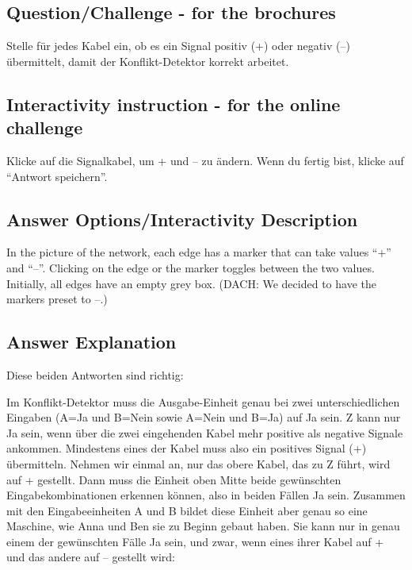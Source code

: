 \documentclass[a4paper,11pt]{report}
\newcommand{\taskGraphicsFolder}{..}
\begin{document}
{\em


\subsection*{Question/Challenge - for the brochures}

Stelle für jedes Kabel ein, ob es ein Signal positiv (+) oder negativ (–) übermittelt, damit der Konflikt-Detektor korrekt arbeitet.

{\centering%
\par}

}


\subsection*{Interactivity instruction - for the online challenge}

Klicke auf die Signalkabel, um + und – zu ändern. Wenn du fertig bist, klicke auf \enquote{Antwort speichern}.

\begingroup
\renewcommand{\arraystretch}{1.5}
\subsection*{Answer Options/Interactivity Description}

In the picture of the network, each edge has a marker that can take values \enquote{+} and \enquote{–}. Clicking on the edge or the marker toggles between the two values. Initially, all edges have an empty grey box.  (DACH: We decided to have the markers preset to –.)

\endgroup

\subsection*{Answer Explanation}

Diese beiden Antworten sind richtig:

{\centering%
\raisebox{-0.5ex}{} \raisebox{-0.5ex}{}\par}

Im Konflikt-Detektor muss die Ausgabe-Einheit genau bei zwei unterschiedlichen Eingaben (A=Ja und B=Nein sowie A=Nein und B=Ja) auf Ja sein. Z kann nur Ja sein, wenn über die zwei eingehenden Kabel mehr positive als negative Signale ankommen.  Mindestens eines der Kabel muss also ein positives Signal (+) übermitteln.  Nehmen wir einmal an, nur das obere Kabel, das zu Z führt, wird auf + gestellt. Dann muss die Einheit oben Mitte beide gewünschten Eingabekombinationen erkennen können, also in beiden Fällen Ja sein.  Zusammen mit den Eingabeeinheiten A und B bildet diese Einheit aber genau so eine Maschine, wie Anna und Ben sie zu Beginn gebaut haben.  Sie kann nur in genau einem der gewünschten Fälle Ja sein, und zwar, wenn eines ihrer Kabel auf + und das andere auf – gestellt wird:
\end{document}

